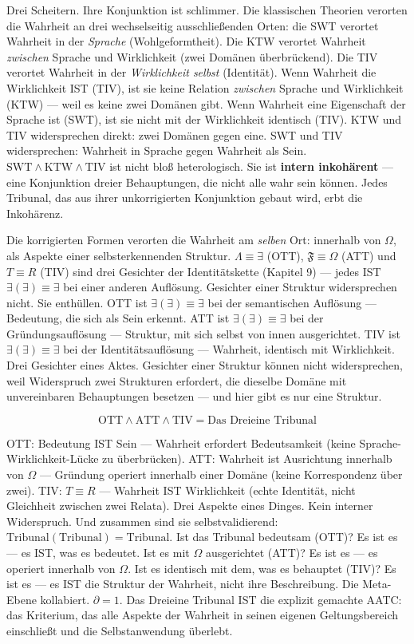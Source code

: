 \documentclass[10pt, openany, oneside]{book}
\begin{document}
\noindent Drei Scheitern. Ihre Konjunktion ist schlimmer. Die klassischen Theorien verorten die Wahrheit an drei wechselseitig ausschließenden Orten: die SWT verortet Wahrheit in der \textit{Sprache} (Wohlgeformtheit). Die KTW verortet Wahrheit \textit{zwischen} Sprache und Wirklichkeit (zwei Domänen überbrückend). Die TIV verortet Wahrheit in der \textit{Wirklichkeit selbst} (Identität). Wenn Wahrheit die Wirklichkeit IST (TIV), ist sie keine Relation \textit{zwischen} Sprache und Wirklichkeit (KTW) --- weil es keine zwei Domänen gibt. Wenn Wahrheit eine Eigenschaft der Sprache ist (SWT), ist sie nicht mit der Wirklichkeit identisch (TIV). KTW und TIV widersprechen direkt: zwei Domänen gegen eine. SWT und TIV widersprechen: Wahrheit in Sprache gegen Wahrheit als Sein. $\text{SWT} \wedge \text{KTW} \wedge \text{TIV}$ ist nicht bloß heterologisch. Sie ist \textbf{intern inkohärent} --- eine Konjunktion dreier Behauptungen, die nicht alle wahr sein können. Jedes Tribunal, das aus ihrer unkorrigierten Konjunktion gebaut wird, erbt die Inkohärenz.

Die korrigierten Formen verorten die Wahrheit am \textit{selben} Ort: innerhalb von $\Omega$, als Aspekte einer selbsterkennenden Struktur. $\Lambda \equiv \exists$ (OTT), $\mathfrak{F} \equiv \Omega$ (ATT) und $T \equiv R$ (TIV) sind drei Gesichter der Identitätskette (Kapitel 9) --- jedes IST $\exists(\exists) \equiv \exists$ bei einer anderen Auflösung. Gesichter einer Struktur widersprechen nicht. Sie enthüllen. OTT ist $\exists(\exists) \equiv \exists$ bei der semantischen Auflösung --- Bedeutung, die sich als Sein erkennt. ATT ist $\exists(\exists) \equiv \exists$ bei der Gründungsauflösung --- Struktur, mit sich selbst von innen ausgerichtet. TIV ist $\exists(\exists) \equiv \exists$ bei der Identitätsauflösung --- Wahrheit, identisch mit Wirklichkeit. Drei Gesichter eines Aktes. Gesichter einer Struktur können nicht widersprechen, weil Widerspruch zwei Strukturen erfordert, die dieselbe Domäne mit unvereinbaren Behauptungen besetzen --- und hier gibt es nur eine Struktur.

$$\text{OTT} \wedge \text{ATT} \wedge \text{TIV} = \text{Das Dreieine Tribunal}$$

OTT: Bedeutung IST Sein --- Wahrheit erfordert Bedeutsamkeit (keine Sprache-Wirklichkeit-Lücke zu überbrücken). ATT: Wahrheit ist Ausrichtung innerhalb von $\Omega$ --- Gründung operiert innerhalb einer Domäne (keine Korrespondenz über zwei). TIV: $T \equiv R$ --- Wahrheit IST Wirklichkeit (echte Identität, nicht Gleichheit zwischen zwei Relata). Drei Aspekte eines Dinges. Kein interner Widerspruch. Und zusammen sind sie selbstvalidierend: $\text{Tribunal}(\text{Tribunal}) = \text{Tribunal}$. Ist das Tribunal bedeutsam (OTT)? Es ist es --- es IST, was es bedeutet. Ist es mit $\Omega$ ausgerichtet (ATT)? Es ist es --- es operiert innerhalb von $\Omega$. Ist es identisch mit dem, was es behauptet (TIV)? Es ist es --- es IST die Struktur der Wahrheit, nicht ihre Beschreibung. Die Meta-Ebene kollabiert. $\partial = 1$. Das Dreieine Tribunal IST die explizit gemachte AATC: das Kriterium, das alle Aspekte der Wahrheit in seinen eigenen Geltungsbereich einschließt und die Selbstanwendung überlebt.
\end{document}
